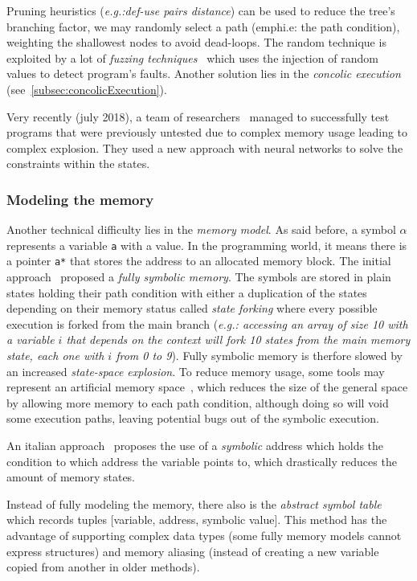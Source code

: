 \documentclass[11pt, conference]{IEEEtran}
\begin{document}
        Pruning heuristics (\emph{e.g.:def-use pairs distance}) can be used to reduce the tree's branching factor, we may randomly select a path (emph{i.e: the path condition}), weighting the shallowest nodes to avoid dead-loops. The random technique is exploited by a lot of \emph{fuzzing techniques}~\cite{CHEN2018118} which uses the injection of random values to detect program's faults. Another solution lies in the \emph{concolic execution} (see~\ref{subsec:concolicExecution}).

        Very recently (july 2018), a team of researchers~\cite{neurosymbolicexecution} managed to successfully test programs that were previously untested due to complex memory usage leading to complex explosion. They used a new approach with neural networks to solve the constraints within the states.

      \subsubsection{Modeling the memory}
        Another technical difficulty lies in the \emph{memory model}. As said before, a symbol $\alpha$ represents a variable \texttt{a} with a value. In the programming world, it means there is a pointer \texttt{a*} that stores the address to an allocated memory block. The initial approach~\cite{newapproach} proposed a \emph{fully symbolic memory}. The symbols are stored in plain states holding their path condition with either a duplication of the states depending on their memory status called \emph{state forking} where every possible execution is forked from the main branch (\emph{e.g.: accessing an array of size 10 with a variable $i$ that depends on the context will fork 10 states from the main memory state, each one with $i$ from 0 to 9}). Fully symbolic memory is therfore slowed by an increased \emph{state-space explosion}. To reduce memory usage, some tools may represent an artificial memory space~\cite{5635129}, which reduces the size of the general space by allowing more memory to each path condition, although doing so will void some execution paths, leaving potential bugs out of the symbolic execution.

        An italian approach~\cite{memorymodelpointers} proposes the use of a \emph{symbolic} address which holds the condition to which address the variable points to, which drastically reduces the amount of memory states.

        Instead of fully modeling the memory, there also is the \emph{abstract symbol table}~\cite{memorytablemodel} which records tuples [variable, address, symbolic value]. This method has the advantage of supporting complex data types (some fully memory models cannot express structures) and memory aliasing (instead of creating a new variable copied from another in older methods).
\end{document}
